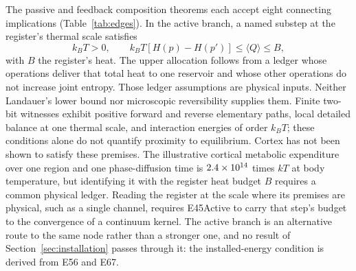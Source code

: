 \documentclass{article}
\begin{document}
The passive and feedback composition theorems each accept eight connecting implications (Table~\ref{tab:edges}). In the active branch, a named substep at the register's thermal scale satisfies
\begin{equation}
 k_BT>0,\qquad k_BT[H(p)-H(p')]\leq\langle Q\rangle\leq B,
 \label{eq:active-chain-bound}
\end{equation}
with $B$ the register's heat. The upper allocation follows from a ledger whose operations deliver that total heat to one reservoir and whose other operations do not increase joint entropy. Those ledger assumptions are physical inputs. Neither Landauer's lower bound nor microscopic reversibility supplies them. Finite two-bit witnesses exhibit positive forward and reverse elementary paths, local detailed balance at one thermal scale, and interaction energies of order $k_BT$; these conditions alone do not quantify proximity to equilibrium. Cortex has not been shown to satisfy these premises. The illustrative cortical metabolic expenditure over one region and one phase-diffusion time is $2.4\times10^{14}$ times $kT$ at body temperature, but identifying it with the register heat budget $B$ requires a common physical ledger. Reading the register at the scale where its premises are physical, such as a single channel, requires E45Active to carry that step's budget to the convergence of a continuum kernel. The active branch is an alternative route to the same node rather than a stronger one, and no result of Section~\ref{sec:installation} passes through it: the installed-energy condition is derived from E56 and E67.
\end{document}
